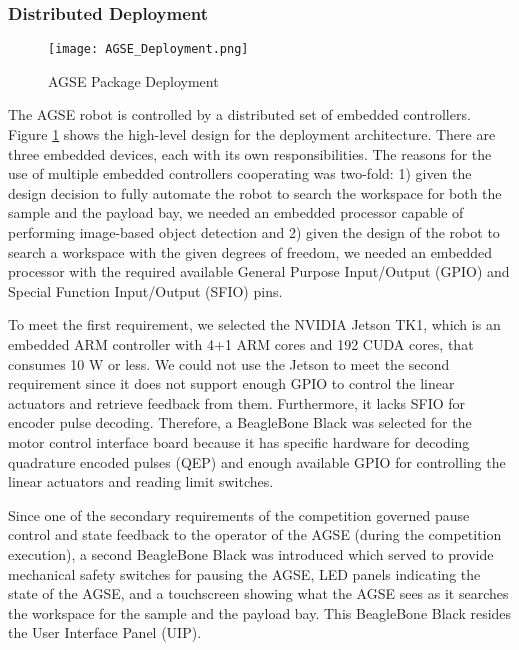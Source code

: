 \subsubsection{Distributed Deployment}

\begin{figure}[h]
	\centering
	\texttt{[image: AGSE\_Deployment.png]}
	\caption{AGSE Package Deployment}
	\label{fig:AGSE_Deployment}
\end{figure}
\FloatBarrier

The AGSE robot is controlled by a distributed set of embedded
controllers. Figure \ref{fig:AGSE_Deployment} shows the high-level
design for the deployment architecture. There are three embedded
devices, each with its own responsibilities.  The reasons for the use
of multiple embedded controllers cooperating was two-fold: 1) given
the design decision to fully automate the robot to search the
workspace for both the sample and the payload bay, we needed an
embedded processor capable of performing image-based object detection
and 2) given the design of the robot to search a workspace with the
given degrees of freedom, we needed an embedded processor with the
required available General Purpose Input/Output (GPIO) and Special
Function Input/Output (SFIO) pins. 

To meet the first requirement, we selected the NVIDIA Jetson TK1, which is an embedded ARM controller
with 4+1 ARM cores and 192 CUDA cores, that consumes 10 W or less.
We could not use the Jetson to meet the second requirement since it
does not support enough GPIO to control the linear actuators and
retrieve feedback from them.  Furthermore, it lacks SFIO for encoder
pulse decoding.  Therefore, a BeagleBone Black was selected for the
motor control interface board because it has specific hardware for
decoding quadrature encoded pulses (QEP) and enough available GPIO for
controlling the linear actuators and reading limit switches.

Since one of the secondary requirements of the competition governed
pause control and state feedback to the operator of the AGSE (during
the competition execution), a second BeagleBone Black was introduced
which served to provide mechanical safety switches for pausing the
AGSE, LED panels indicating the state of the AGSE, and a touchscreen
showing what the AGSE sees as it searches the workspace for the sample
and the payload bay.  This BeagleBone Black resides the User Interface
Panel (UIP).

